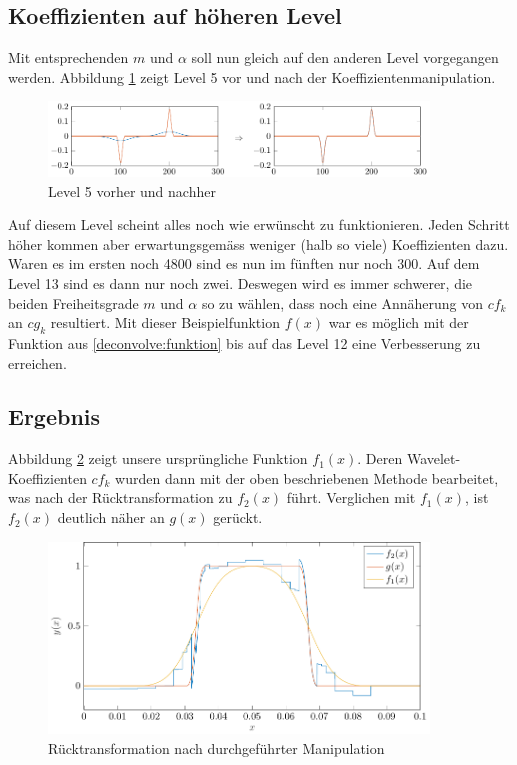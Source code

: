\subsection{Koeffizienten auf höheren Level}

Mit entsprechenden $m$ und $\alpha$ soll nun gleich auf den anderen Level vorgegangen werden.
Abbildung \ref{deconvolve:level5} zeigt Level 5 vor und nach der Koeffizientenmanipulation.
\begin{figure}[h]
\centering
\includegraphics[width=0.9\textwidth]{./papers/deconvolve/pictures/level/level5.pdf}
\caption{Level 5 vorher und nachher\label{deconvolve:level5}}
\end{figure}

Auf diesem Level scheint alles noch wie erwünscht zu funktionieren.
Jeden Schritt höher kommen aber erwartungsgemäss weniger (halb so viele) Koeffizienten dazu.
Waren es im ersten noch 4800 sind es nun im fünften nur noch 300.
Auf dem Level 13 sind es dann nur noch zwei.
Deswegen wird es immer schwerer, die beiden Freiheitsgrade $m$ und $\alpha$ so zu wählen, dass noch eine Annäherung von $cf_k$ an $cg_k$ resultiert.
Mit dieser Beispielfunktion $f(x)$ war es möglich mit der Funktion aus \eqref{deconvolve:funktion} bis auf das Level 12 eine Verbesserung zu erreichen.

\subsection{Ergebnis}
Abbildung \ref{deconvolve:result_1d} zeigt unsere ursprüngliche Funktion $f_1(x)$.
Deren Wavelet-Koeffizienten $cf_k$ wurden dann mit der oben beschriebenen Methode bearbeitet, was nach der Rücktransformation zu $f_2(x)$ führt.
Verglichen mit $f_1(x)$, ist $f_2(x)$ deutlich näher an $g(x)$ gerückt.
\begin{figure}[h]
\centering
\includegraphics[width=0.9\textwidth]{./papers/deconvolve/pictures/result_1d.pdf}
\caption{Rücktransformation nach durchgeführter Manipulation\label{deconvolve:result_1d}}
\end{figure}

